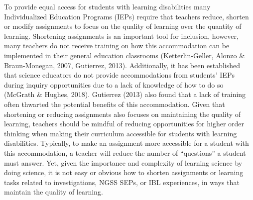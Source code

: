 \documentclass[11pt]{sig-alternate}
\begin{document}
\begin{large}
To provide equal access for students with learning disabilities many Individualized Education Programs (IEPs) require that teachers reduce, shorten or modify assignments to focus on the quality of learning over the quantity of learning. Shortening assignments is an important tool for inclusion, however, many teachers do not receive training on how this accommodation can be implemented in their general education classrooms (Ketterlin-Geller, Alonzo \& Braun-Monegan, 2007, Gutierrez, 2013). Additionally, it has been established that science educators do not provide accommodations from students’ IEPs during inquiry opportunities due to a lack of knowledge of how to do so (McGrath \& Hughes, 2018). Gutierrez (2013) also found that a lack of training often thwarted the potential benefits of this accommodation. Given that shortening or reducing assignments also focuses on maintaining the quality of learning, teachers should be mindful of reducing opportunities for higher order thinking when making their curriculum accessible for students with learning disabilities. Typically, to make an assignment more accessible for a student with this accommodation, a teacher will reduce the number of “questions” a student must answer. Yet, given the importance and complexity of learning science by doing science, it is not easy or obvious how to shorten assignments or learning tasks related to investigations, NGSS SEPs, or IBL experiences, in ways that maintain the quality of learning.


\end{large}
\end{document}
